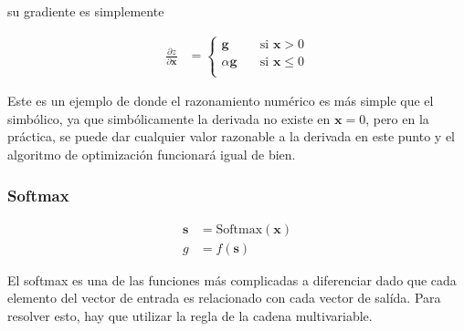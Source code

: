 \documentclass{article}
\begin{document}
su gradiente es simplemente

\begin{align*}
	\frac{\partial z}{\partial \bm{x}} &= \begin{cases}
		\bm{g} \quad &\text{si } \bm{x} > 0 \\
		\alpha \bm{g} \quad &\text{si } \bm{x} \leq 0 \\
	\end{cases}
\end{align*}

Este es un ejemplo de donde el razonamiento numérico es más simple que el simbólico, ya que simbólicamente
la derivada no existe en $\bm{x} = 0$, pero en la práctica,
se puede dar cualquier valor razonable a la derivada en este punto
y el algoritmo de optimización funcionará igual de bien.

\newpage
\subsubsection*{Softmax}


\begin{align*}
	\bm{s} &= \text{Softmax}(\bm{x}) \\%
	g &= f(\bm{s})
\end{align*}

El softmax es una de las funciones más complicadas a diferenciar
dado que cada elemento del vector de entrada es relacionado con
cada vector de salída.
Para resolver esto, hay que utilizar la regla de la cadena multivariable.

\def\empty{null}
\end{document}

